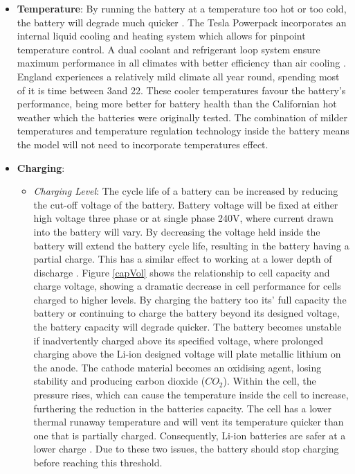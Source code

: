 \begin{itemize}
\item
  \textbf{Temperature}: By running the battery at a temperature too hot
  or too cold, the battery will degrade much quicker
  \cite{rong2006analytical}. The Tesla Powerpack incorporates an
  internal liquid cooling and heating system which allows for pinpoint
  temperature control. A dual coolant and refrigerant loop system ensure
  maximum performance in all climates with better efficiency than air
  cooling \cite{Powerpac95:online}. England experiences a relatively
  mild climate all year round, spending most of it is time between
  3\degree and 22\degree \cite{WeatherA0:online}. These cooler
  temperatures favour the battery's performance, being more better for
  battery health than the Californian hot weather which the batteries
  were originally tested. The combination of milder temperatures and
  temperature regulation technology inside the battery means the model
  will not need to incorporate temperatures effect.
\item
  \textbf{Charging}:

  \begin{itemize}
  \tightlist
  \item
    \emph{Charging Level}: The cycle life of a battery can be increased
    by reducing the cut-off voltage of the battery. Battery voltage will
    be fixed at either high voltage three phase or at single phase 240V,
    where current drawn into the battery will vary. By decreasing the
    voltage held inside the battery will extend the battery cycle life,
    resulting in the battery having a partial charge. This has a similar
    effect to working at a lower depth of discharge \cite{Choi2002130}.
    Figure \ref{capVol} shows the relationship to cell capacity and
    charge voltage, showing a dramatic decrease in cell performance for
    cells charged to higher levels. By charging the battery too its'
    full capacity the battery or continuing to charge the battery beyond
    its designed voltage, the battery capacity will degrade quicker. The
    battery becomes unstable if inadvertently charged above its
    specified voltage, where prolonged charging above the Li-ion
    designed voltage will plate metallic lithium on the anode. The
    cathode material becomes an oxidising agent, losing stability and
    producing carbon dioxide (\(CO_2\)). Within the cell, the pressure
    rises, which can cause the temperature inside the cell to increase,
    furthering the reduction in the batteries capacity. The cell has a
    lower thermal runaway temperature and will vent its temperature
    quicker than one that is partially charged. Consequently, Li-ion
    batteries are safer at a lower charge \cite{Charging53:online}. Due
    to these two issues, the battery should stop charging before
    reaching this threshold.


\end{itemize}
\end{itemize}
